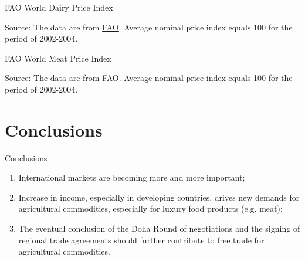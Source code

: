 \documentclass[table,xcolor=pdftex,dvipsnames]{beamer}\usepackage[]{graphicx}\usepackage[]{color}
\makeatletter
\newenvironment{kframe}{%
 \def\at@end@of@kframe{}%
 \ifinner\ifhmode%
  \def\at@end@of@kframe{\end{minipage}}%
  \begin{minipage}{\columnwidth}%
 \fi\fi%
 \def\FrameCommand##1{\hskip\@totalleftmargin \hskip-\fboxsep
 \colorbox{shadecolor}{##1}\hskip-\fboxsep
     \hskip-\linewidth \hskip-\@totalleftmargin \hskip\columnwidth}%
 \MakeFramed {\advance\hsize-\width
   \@totalleftmargin\z@ \linewidth\hsize
   \@setminipage}}%
 {\par\unskip\endMakeFramed%
 \at@end@of@kframe}
\newenvironment{knitrout}{}{} %
\makeatother
\begin{document}
\begin{frame}{FAO World Dairy Price Index}
\begin{knitrout}
\color{fgcolor}\begin{kframe}


{\ttfamily\noindent\bfseries\color{errorcolor}{\#\# Error in print(World\_Dairy\_index): object 'World\_Dairy\_index' not found}}\end{kframe}
\end{knitrout}
\scriptsize
Source: The data are from \href{http://www.fao.org/worldfoodsituation/wfs-home/foodpricesindex/en/}{FAO}. Average nominal price index equals 100 for the period of 2002-2004.
\end{frame}

\begin{frame}{FAO World Meat Price Index}
\begin{knitrout}
\color{fgcolor}\begin{kframe}


{\ttfamily\noindent\bfseries\color{errorcolor}{\#\# Error in print(WorldMeatindex): object 'WorldMeatindex' not found}}\end{kframe}
\end{knitrout}
\scriptsize
Source: The data are from \href{http://www.fao.org/worldfoodsituation/wfs-home/foodpricesindex/en/}{FAO}. Average nominal price index equals 100 for the period of 2002-2004.
\end{frame}


\section{Conclusions}

\begin{frame}{Conclusions}
\begin{enumerate}[label=\textbullet]
    \item International markets are becoming more and more important;
    \item Increase in income, especially in developing countries, drives new demands for agricultural commodities, especially for luxury food products (e.g. meat);
    \item The eventual conclusion of the Doha Round of negotiations and the signing of regional trade agreements should further contribute to free trade for agricultural commodities.
\end{enumerate}
\end{frame}
\end{document}

